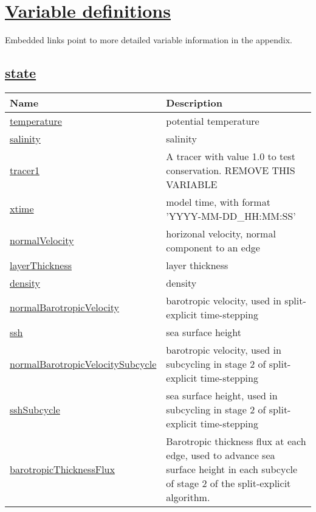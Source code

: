 \chapter[Variable definitions]{\hyperref[chap:variable_sections]{Variable definitions}}
\label{chap:variable_tables}
Embedded links point to more detailed variable information in the appendix.
\section[state]{\hyperref[sec:var_sec_state]{state}}
\label{sec:var_tab_state}

{\small
\begin{center}
\begin{longtable}{| p{2.0in} | p{4.0in} |}
	\hline
	{\bf Name} & {\bf Description} \\
	\hline
	\hyperref[subsec:var_sec_state_temperature]{temperature} & potential temperature \\
	\hline
	\hyperref[subsec:var_sec_state_salinity]{salinity} & salinity \\
	\hline
	\hyperref[subsec:var_sec_state_tracer1]{tracer1} & A tracer with value 1.0 to test conservation.  {\color{red} REMOVE THIS VARIABLE} \\
	\hline
	\hyperref[subsec:var_sec_state_xtime]{xtime} & model time, with format 'YYYY-MM-DD\_HH:MM:SS' \\
	\hline
	\hyperref[subsec:var_sec_state_normalVelocity]{normalVelocity} & horizonal velocity, normal component to an edge \\
	\hline
	\hyperref[subsec:var_sec_state_layerThickness]{layerThickness} & layer thickness \\
	\hline
	\hyperref[subsec:var_sec_state_density]{density} & density \\
	\hline
	\hyperref[subsec:var_sec_state_normalBarotropicVelocity]{normalBarotropicVelocity} & barotropic velocity, used in split-explicit time-stepping \\
	\hline
	\hyperref[subsec:var_sec_state_ssh]{ssh} & sea surface height \\
	\hline
	\hyperref[subsec:var_sec_state_normalBarotropicVelocitySubcycle]{normalBarotropicVelocitySubcycle} & barotropic velocity, used in subcycling in stage 2 of split-explicit time-stepping \\
	\hline
	\hyperref[subsec:var_sec_state_sshSubcycle]{sshSubcycle} & sea surface height, used in subcycling in stage 2 of split-explicit time-stepping \\
	\hline
	\hyperref[subsec:var_sec_state_barotropicThicknessFlux]{barotropicThicknessFlux} & Barotropic thickness flux at each edge, used to advance sea surface height in each subcycle of stage 2 of the split-explicit algorithm. \\

\end{longtable}
\end{center}}

